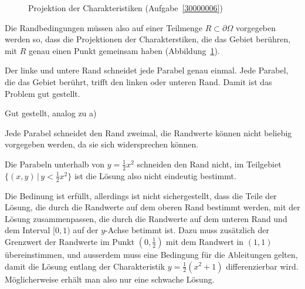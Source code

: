 \begin{loesung}
\begin{figure}
\begin{center}
\end{center}
\caption{Projektion der Charakteristiken (Aufgabe~\ref{30000006})
\label{30000006:char}}
\end{figure}
Die Randbedingungen müssen also auf einer Teilmenge $R\subset \partial\Omega$
vorgegeben werden so, dass die Projektionen der Charakterstiken, die das
Gebiet berühren, mit $R$ genau einen Punkt gemeinsam haben (Abbildung~\ref{30000006:char}). 
\begin{teilaufgaben}
\item Der linke und untere Rand schneidet jede Parabel genau einmal. 
Jede Parabel, die das Gebiet berührt, trifft den linken oder unteren
Rand. Damit ist das Problem gut gestellt.
\item Gut gestellt, analog zu a)
\item Jede Parabel schneidet den Rand zweimal, die Randwerte können nicht
beliebig vorgegeben werden, da sie sich widersprechen können.
\item Die Parabeln unterhalb von $y=\frac12x^2$ schneiden den Rand
nicht, im Teilgebiet $\{(x,y)\,|\, y<\frac12x^2\}$ ist die Lösung also
nicht eindeutig bestimmt.
\item Die Bedinung ist erfüllt, allerdings ist nicht sichergestellt,
dass die Teile der Lösung, die durch die Randwerte auf dem oberen 
Rand bestimmt werden, mit der Lösung zusammenpassen, die durch
die Randwerte auf dem unteren Rand und dem Interval $[0,1)$ auf
der $y$-Achse betimmt ist. Dazu muss zusätzlich der Grenzwert
der Randwerte im Punkt $(0,\frac12)$ mit dem Randwert in $(1,1)$
übereinstimmen, und ausserdem muss eine Bedingung für die Ableitungen
gelten, damit die Lösung entlang der Charakteristik $y=\frac12(x^2+1)$
differenzierbar wird. Möglicherweise erhält man also nur eine
schwache Lösung.
\qedhere
\end{teilaufgaben}
\end{loesung}
